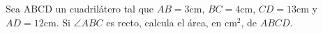 Sea ABCD un cuadrilátero tal que $AB=3$cm, $BC=4$cm, $CD=13$cm y $AD = 12$cm. Si $\angle ABC$ es recto, calcula el área, en cm$^2$, de $ABCD$.